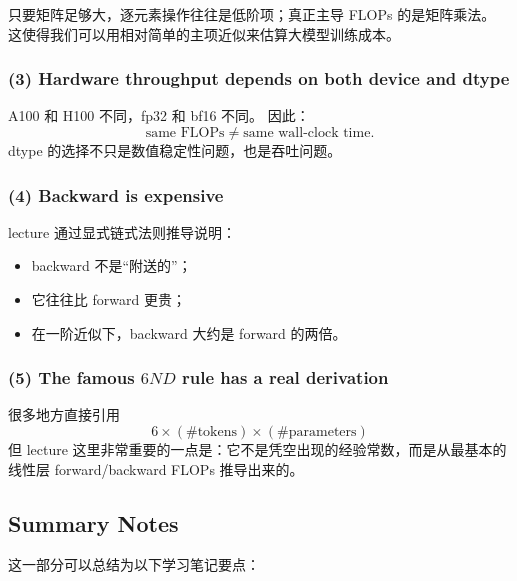 \documentclass[a4paper,UTF8]{article}
\numberwithin{equation}{section}
\begin{document}
只要矩阵足够大，逐元素操作往往是低阶项；真正主导 FLOPs 的是矩阵乘法。  
这使得我们可以用相对简单的主项近似来估算大模型训练成本。

\subsubsection{(3) Hardware throughput depends on both device and dtype}

A100 和 H100 不同，fp32 和 bf16 不同。  
因此：
\[
\text{same FLOPs} \neq \text{same wall-clock time}.
\]
dtype 的选择不只是数值稳定性问题，也是吞吐问题。

\subsubsection{(4) Backward is expensive}

lecture 通过显式链式法则推导说明：
\begin{itemize}
    \item backward 不是“附送的”；
    \item 它往往比 forward 更贵；
    \item 在一阶近似下，backward 大约是 forward 的两倍。
\end{itemize}

\subsubsection{(5) The famous \(6ND\) rule has a real derivation}

很多地方直接引用
\[
6 \times (\#\text{tokens}) \times (\#\text{parameters})
\]
但 lecture 这里非常重要的一点是：它不是凭空出现的经验常数，而是从最基本的线性层 forward/backward FLOPs 推导出来的。

\subsection{Summary Notes}

这一部分可以总结为以下学习笔记要点：
\end{document}

